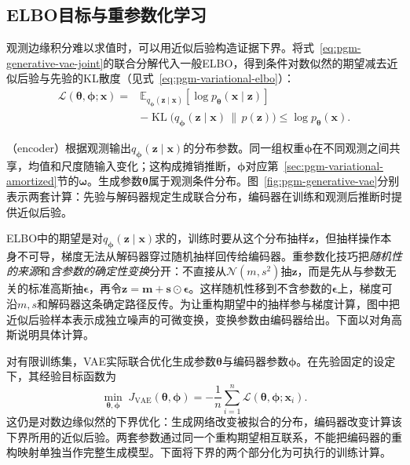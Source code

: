 \subsection{ELBO目标与重参数化学习}


\label{sec:pgm-generative-vae-objective}

观测边缘积分难以求值时，可以用近似后验构造证据下界。将式~\eqref{eq:pgm-generative-vae-joint}的联合分解代入一般ELBO，得到条件对数似然的期望减去近似后验与先验的KL散度（见式~\eqref{eq:pgm-variational-elbo}）：
\begin{equation}
  \label{eq:pgm-generative-vae-elbo}
  \begin{aligned}
    \mathcal{L}(\bm{\theta},\bm{\phi};\bm{x})
    ={}&\mathbb{E}_{q_{\bm{\phi}}(\bm{z}\mid\bm{x})}
       [\log p_{\bm{\theta}}(\bm{x}\mid\bm{z})]\\
      &-\operatorname{KL}\bigl(
       q_{\bm{\phi}}(\bm{z}\mid\bm{x})\,\|\,p(\bm{z})\bigr)
      \leq\log p_{\bm{\theta}}(\bm{x}).
  \end{aligned}
\end{equation}

（encoder）根据观测输出$q_{\bm{\phi}}(\bm{z}\mid\bm{x})$的分布参数。同一组权重$\bm{\phi}$在不同观测之间共享，均值和尺度随输入变化；这构成摊销推断，$\bm{\phi}$对应第~\ref{sec:pgm-variational-amortized}节的$\bm{\omega}$。生成参数$\bm{\theta}$属于观测条件分布。图~\ref{fig:pgm-generative-vae}分别表示两套计算：先验与解码器规定生成联合分布，编码器在训练和观测后推断时提供近似后验。

ELBO中的期望是对$q_{\bm\phi}(\bm z\mid\bm x)$求的，训练时要从这个分布抽样$\bm z$，但抽样操作本身不可导，梯度无法从解码器穿过随机抽样回传给编码器。重参数化技巧把\emph{随机性的来源}和\emph{含参数的确定性变换}分开：不直接从$\mathcal N(m,s^2)$抽$\bm z$，而是先从与参数无关的标准高斯抽$\bm\epsilon$，再令$\bm z=\bm m+\bm s\odot\bm\epsilon$。这样随机性移到不含参数的$\bm\epsilon$上，梯度可沿$m,s$和解码器这条确定路径反传。为让重构期望中的抽样参与梯度计算，图中把近似后验样本表示成独立噪声的可微变换，变换参数由编码器给出。下面以对角高斯说明具体计算。

对有限训练集，VAE实际联合优化生成参数$\bm\theta$与编码器参数$\bm\phi$。在先验固定的设定下，其经验目标函数为
\begin{equation}
  \label{eq:pgm-generative-vae-empirical-objective}
  \min_{\bm\theta,\bm\phi}\;
  J_{\mathrm{VAE}}(\bm\theta,\bm\phi)
  =-\frac1n\sum_{i=1}^{n}
       \mathcal L(\bm\theta,\bm\phi;\bm x_i).
\end{equation}
这仍是对数边缘似然的下界优化：生成网络改变被拟合的分布，编码器改变计算该下界所用的近似后验。两套参数通过同一个重构期望相互联系，不能把编码器的重构映射单独当作完整生成模型。下面将下界的两个部分化为可执行的训练计算。

